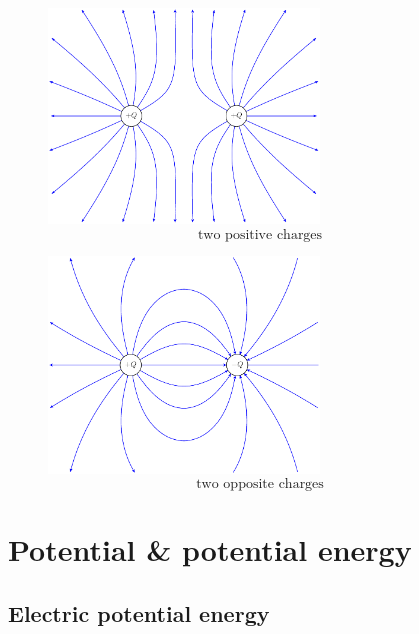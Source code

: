 
\begin{figure}
	\noindent\begin{minipage}{0.48\textwidth}
		\begin{center}
			\includegraphics[width=7.2cm]{f-lines-eq-ch.pdf}
			\begin{equation*}
			\text{two positive charges}
			\end{equation*}
		\end{center}
	\end{minipage}\hfill
	\begin{minipage}{0.48\textwidth}
		\begin{center}
			\includegraphics[width=7.2cm]{f-lines-op-ch.pdf}
			\begin{equation*}
			\text{two opposite charges} 
			\end{equation*}
		\end{center}	
	\end{minipage}
\end{figure}

\section{Potential \& potential energy }

\subsection{Electric potential energy}
\label{sec:electric-potential}

